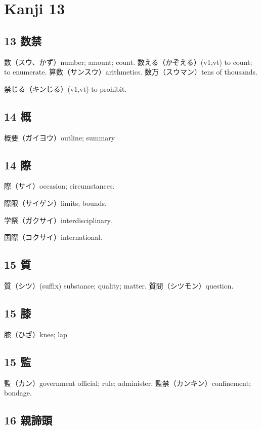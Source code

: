 \chapter{Kanji 13}

\section{13 数禁}

数（スウ、かず）number; amount; count.
数える（かぞえる）(v1,vt) to count; to enumerate.
算数（サンスウ）arithmetics.
数万（スウマン）tens of thousands.

禁じる（キンじる）(v1,vt) to prohibit.

\section{14 概}

概要（ガイヨウ）outline; summary

\section{14 際}

際（サイ）occasion; circumstances.

際限（サイゲン）limits; bounds.

学祭（ガクサイ）interdisciplinary.

国際（コクサイ）international.

\section{15 質}

質（シツ）(suffix) substance; quality; matter.
質問（シツモン）question.

\section{15 膝}

膝（ひざ）knee; lap

\section{15 監}

監（カン）government official; rule; administer.
監禁（カンキン）confinement; bondage.

\section{16 親諦頭}

